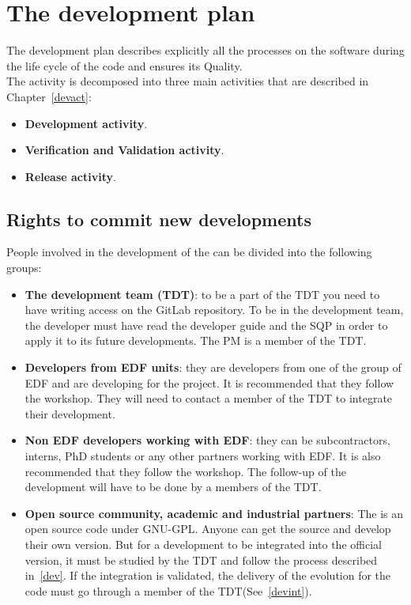 \chapter{The \telemacsystem{} development plan}
\label{devplan}

The development plan describes explicitly all the processes on the software
during the life cycle of the \telemacsystem{} code and ensures its Quality.\\

The \telemacsystem{} activity is decomposed into three main activities that are
described in Chapter~\ref{devact}:
\begin{itemize}
\item \textbf{Development activity}.
\item \textbf{Verification and Validation activity}.
\item \textbf{Release activity}.
\end{itemize}

\section{Rights to commit new developments}

People involved in the development of the \telemacsystem{} can be divided into
the following groups:
\begin{itemize}
\item \textbf{The \telemacsystem{} development team (TDT)}: to be a part of the
  TDT you need to have writing access on the GitLab repository. To be in
  the development team, the developer must have read the developer guide and
  the SQP in order to apply it to its future developments. The PM is a member
  of the TDT\@.
\item \textbf{Developers from EDF units}: they are developers from one of the
  group of EDF and are developing for the \telemacsystem{} project. It is
  recommended that they follow the \telemacsystem{} workshop. They will need to
  contact a member of the TDT to integrate their development.
\item \textbf{Non EDF developers working with EDF}: they can be subcontractors,
  interns, PhD students or any other partners working with EDF\@. It is also
  recommended that they follow the \telemacsystem{} workshop. The follow-up of
  the development will have to be done by a members of the TDT\@.
\item \textbf{Open source community, academic and industrial partners}:
  The \telemacsystem{} is an open source code under GNU-GPL\@. Anyone can get
  the source and develop their own version. But for a development to be
  integrated into the official version, it must be studied by the TDT and
  follow the process described in~\ref{dev}. If the integration is validated,
  the delivery of the evolution for the code must go through a member of the
  TDT\@ (See~\ref{devint}).
\end{itemize}


